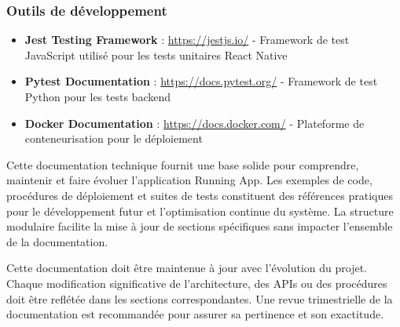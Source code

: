 \subsubsection{Outils de développement}

\begin{itemize}[leftmargin=1cm]
\item \textbf{Jest Testing Framework} : \url{https://jestjs.io/} - Framework de test JavaScript utilisé pour les tests unitaires React Native
\item \textbf{Pytest Documentation} : \url{https://docs.pytest.org/} - Framework de test Python pour les tests backend
\item \textbf{Docker Documentation} : \url{https://docs.docker.com/} - Plateforme de conteneurisation pour le déploiement
\end{itemize}

\begin{successbox}
Cette documentation technique fournit une base solide pour comprendre, maintenir et faire évoluer l'application Running App. Les exemples de code, procédures de déploiement et suites de tests constituent des références pratiques pour le développement futur et l'optimisation continue du système. La structure modulaire facilite la mise à jour de sections spécifiques sans impacter l'ensemble de la documentation.
\end{successbox}

\begin{warningbox}
Cette documentation doit être maintenue à jour avec l'évolution du projet. Chaque modification significative de l'architecture, des APIs ou des procédures doit être reflétée dans les sections correspondantes. Une revue trimestrielle de la documentation est recommandée pour assurer sa pertinence et son exactitude.
\end{warningbox}
